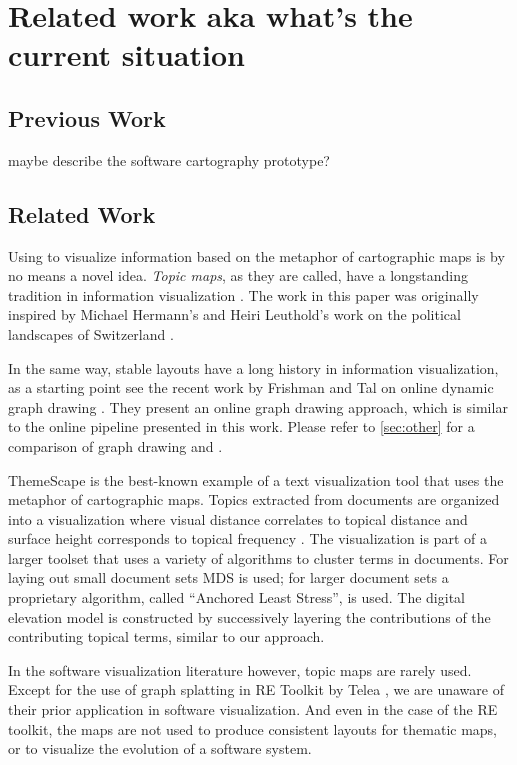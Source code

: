 \chapter{Related work aka what's the current situation}

\section{Previous Work}
maybe describe the software cartography prototype?

\section{Related Work}


Using \MDS to visualize information based on the metaphor of cartographic maps is by no means a novel idea. \emph{Topic maps}, as they are called, have a longstanding tradition in information visualization \cite{Ware04a}. The work in this paper was originally inspired by Michael Hermann's and Heiri Leuthold's work on the political landscapes of Switzerland \cite{Herm03a}. 

In the same way, stable layouts have a long history in information visualization, as a starting point see \eg the recent work by Frishman and Tal on online dynamic graph drawing \cite{Fris08a}. They present an online graph drawing approach, which is similar to the online pipeline presented in this work. Please refer to \autoref{sec:other} for a comparison of graph drawing and \MDS. 

ThemeScape is the best-known example of a text visualization tool that uses the metaphor of cartographic maps. 
Topics extracted from documents are organized into a visualization where visual distance correlates to topical distance and surface height corresponds to topical frequency \cite{Wise95b}. The visualization is part of a larger toolset that uses a variety of algorithms to cluster terms in documents. For laying out small document sets MDS is used; for larger document sets a proprietary algorithm, called ``Anchored Least Stress'', is used. The digital elevation model is constructed by successively layering the contributions of the contributing topical terms, similar to our approach.

In the software visualization literature however, topic maps are rarely used.
Except for the use of graph splatting in RE Toolkit by Telea \etal \cite{Tele03a}, we are unaware of their prior application in software visualization. And even in the case of the RE toolkit, the maps are not used to produce consistent layouts for thematic maps, or to visualize the evolution of a software system. 

